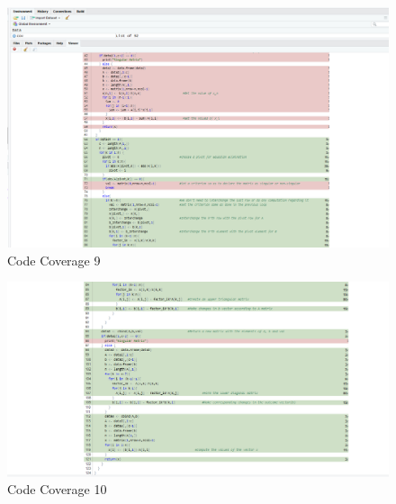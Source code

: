 \documentclass[12pt, titlepage]{article}
\begin{document}
\begin{figure}[H]
\centering
 \includegraphics[width=120mm]{CV6}
  \caption{Code Coverage 9}
  \label{fig:CV6}
\end{figure}

\begin{figure}[H]
\centering
 \includegraphics[width=120mm]{CV7}
  \caption{Code Coverage 10}
  \label{fig:CV7}
\end{figure}




\end{document}

